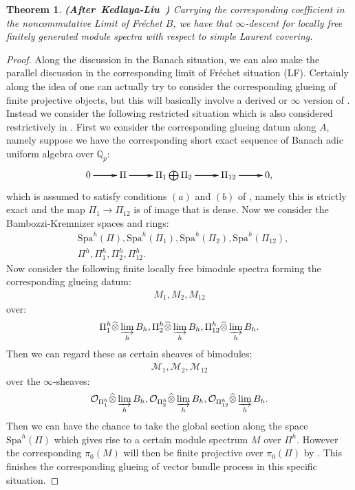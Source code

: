 \documentclass[12pt]{amsart}
\newtheorem{theorem}{Theorem}[section]
\theoremstyle{definition}
\numberwithin{equation}{section}
\begin{document}
\begin{theorem} \mbox{\bf{(After Kedlaya-Liu \cite[Theorem 2.7.7]{KL1})}}
Carrying the corresponding coefficient in the noncommutative Limit of Fr\'echet $B$, we have that $\infty$-descent for locally free finitely generated module spectra with respect to simple Laurent covering.	
\end{theorem}


\begin{proof} 
\indent Along the discussion in the Banach situation, we can also make the parallel discussion in the corresponding limit of Fr\'echet situation (LF). Certainly along the idea of \cite[Theorem 2.7.7]{KL1} one can actually try to consider the corresponding glueing of finite projective objects, but this will basically involve a derived or $\infty$ version of \cite[Proposition 2.4.20]{KL1}. Instead we consider the following restricted situation which is also considered restrictively in \cite[Section 5]{T3}. First we consider the corresponding glueing datum along $A$, namely suppose we have the corresponding short exact sequence of Banach adic uniform algebra over $\mathbb{Q}_p$:
\[
\xymatrix@C+0pc@R+0pc{
0   \ar[r]\ar[r]\ar[r] &\Pi \ar[r]\ar[r]\ar[r] &\Pi_1\bigoplus \Pi_2 \ar[r]\ar[r]\ar[r] & \Pi_{12} \ar[r]\ar[r]\ar[r] &0,
}
\]
which is assumed to satisfy conditions $(a)$ and $(b)$ of \cite[Definition 2.7.3]{KL1}, namely this is strictly exact and the map $\Pi_1\rightarrow \Pi_{12}$ is of image that is dense. Now we consider the Bambozzi-Kremnizer spaces and rings:
\begin{align}
&\mathrm{Spa}^h(\Pi),\mathrm{Spa}^h(\Pi_1),\mathrm{Spa}^h(\Pi_2),\mathrm{Spa}^h(\Pi_{12}),\\
&\Pi^h,\Pi_1^h,\Pi_2^h,\Pi_{12}^h.  	
\end{align}
Now consider the following finite locally free bimodule spectra forming the corresponding glueing datum:
\begin{align}
M_1,M_2,M_{12}	
\end{align}
over:
\begin{align}
\Pi_1^h\widehat{\otimes}\varinjlim_h B_h,\Pi_2^h\widehat{\otimes}\varinjlim_h B_h,\Pi_{12}^h\widehat{\otimes}\varinjlim_h B_h.
\end{align}
Then we can regard these as certain sheaves of bimodules:
\begin{align}
\mathcal{M}_1,\mathcal{M}_2,\mathcal{M}_{12}	
\end{align}
over the $\infty$-sheaves:
\begin{align}
\mathcal{O}_{\Pi_1^h}\widehat{\otimes}\varinjlim_h B_h,\mathcal{O}_{\Pi_2^h}\widehat{\otimes}\varinjlim_h B_h,\mathcal{O}_{\Pi_{12}^h}\widehat{\otimes}\varinjlim_h B_h.
\end{align}
Then we can have the chance to take the global section along the space $\mathrm{Spa}^h(\Pi)$ which gives rise to a certain module spectrum $M$ over $\Pi^h$. However the corresponding $\pi_0(M)$ will then be finite projective over $\pi_0(\Pi)$ by \cite[Proposition 5.12]{T3}. This finishes the corresponding glueing of vector bundle process in this specific situation.
\end{proof}
\end{document}

